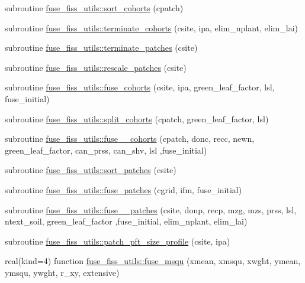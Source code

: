 \begin{DoxyCompactItemize}
\item 
subroutine \hyperlink{namespacefuse__fiss__utils_a31e4835d2465d1400c7cbbb51976b341}{fuse\+\_\+fiss\+\_\+utils\+::sort\+\_\+cohorts} (cpatch)
\item 
subroutine \hyperlink{namespacefuse__fiss__utils_a5dc8f0ad95ff159ac69570ac55856524}{fuse\+\_\+fiss\+\_\+utils\+::terminate\+\_\+cohorts} (csite, ipa, elim\+\_\+nplant, elim\+\_\+lai)
\item 
subroutine \hyperlink{namespacefuse__fiss__utils_a480df748f946b24daa940c15d72abfe2}{fuse\+\_\+fiss\+\_\+utils\+::terminate\+\_\+patches} (csite)
\item 
subroutine \hyperlink{namespacefuse__fiss__utils_ab3b0eeed8a63cc2f4b866ac243e25ec6}{fuse\+\_\+fiss\+\_\+utils\+::rescale\+\_\+patches} (csite)
\item 
subroutine \hyperlink{namespacefuse__fiss__utils_adebb5663823fc54b5e7f28ce1e365afe}{fuse\+\_\+fiss\+\_\+utils\+::fuse\+\_\+cohorts} (csite, ipa, green\+\_\+leaf\+\_\+factor, lsl, fuse\+\_\+initial)
\item 
subroutine \hyperlink{namespacefuse__fiss__utils_a57242703afe9eb00a9aa836ff925bffc}{fuse\+\_\+fiss\+\_\+utils\+::split\+\_\+cohorts} (cpatch, green\+\_\+leaf\+\_\+factor, lsl)
\item 
subroutine \hyperlink{namespacefuse__fiss__utils_ad49d6cf9affbac930e3d5be9c8baae39}{fuse\+\_\+fiss\+\_\+utils\+::fuse\+\_\+\_\+cohorts} (cpatch, donc, recc, newn, green\+\_\+leaf\+\_\+factor, can\+\_\+prss, can\+\_\+shv, lsl                                                                                                           ,fuse\+\_\+initial)
\item 
subroutine \hyperlink{namespacefuse__fiss__utils_a546d7beff2f991a07c8fbba91921ce5f}{fuse\+\_\+fiss\+\_\+utils\+::sort\+\_\+patches} (csite)
\item 
subroutine \hyperlink{namespacefuse__fiss__utils_aee30640ff825246fb4c9f5f1f41470be}{fuse\+\_\+fiss\+\_\+utils\+::fuse\+\_\+patches} (cgrid, ifm, fuse\+\_\+initial)
\item 
subroutine \hyperlink{namespacefuse__fiss__utils_ac265957681eedff0e33bd5c3cdeca31d}{fuse\+\_\+fiss\+\_\+utils\+::fuse\+\_\+\_\+patches} (csite, donp, recp, mzg, mzs, prss, lsl, ntext\+\_\+soil, green\+\_\+leaf\+\_\+factor                                                                                                           ,fuse\+\_\+initial, elim\+\_\+nplant, elim\+\_\+lai)
\item 
subroutine \hyperlink{namespacefuse__fiss__utils_ac7660eaa2d7565040ef120ac454ef406}{fuse\+\_\+fiss\+\_\+utils\+::patch\+\_\+pft\+\_\+size\+\_\+profile} (csite, ipa)
\item 
real(kind=4) function \hyperlink{namespacefuse__fiss__utils_aae52213c98fe3ffb3ecde24d8ffc6e03}{fuse\+\_\+fiss\+\_\+utils\+::fuse\+\_\+msqu} (xmean, xmsqu, xwght, ymean, ymsqu, ywght, r\+\_\+xy, extensive)
\end{DoxyCompactItemize}
